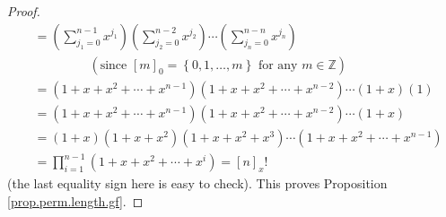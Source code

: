 \begin{proof}
\begin{align*}
&  =\left(  \sum_{j_{1}=0}^{n-1}x^{j_{1}}\right)  \left(  \sum_{j_{2}=0}%
^{n-2}x^{j_{2}}\right)  \cdots\left(  \sum_{j_{n}=0}^{n-n}x^{j_{n}}\right) \\
&  \ \ \ \ \ \ \ \ \ \ \ \ \ \ \ \ \ \ \ \ \left(  \text{since }\left[
m\right]  _{0}=\left\{  0,1,\ldots,m\right\}  \text{ for any }m\in
\mathbb{Z}\right) \\
&  =\left(  1+x+x^{2}+\cdots+x^{n-1}\right)  \left(  1+x+x^{2}+\cdots
+x^{n-2}\right)  \cdots\left(  1+x\right)  \left(  1\right) \\
&  =\left(  1+x+x^{2}+\cdots+x^{n-1}\right)  \left(  1+x+x^{2}+\cdots
+x^{n-2}\right)  \cdots\left(  1+x\right) \\
&  =\left(  1+x\right)  \left(  1+x+x^{2}\right)  \left(  1+x+x^{2}%
+x^{3}\right)  \cdots\left(  1+x+x^{2}+\cdots+x^{n-1}\right) \\
&  =\prod_{i=1}^{n-1}\left(  1+x+x^{2}+\cdots+x^{i}\right)  =\left[  n\right]
_{x}!
\end{align*}
(the last equality sign here is easy to check). This proves Proposition
\ref{prop.perm.length.gf}.
\end{proof}

